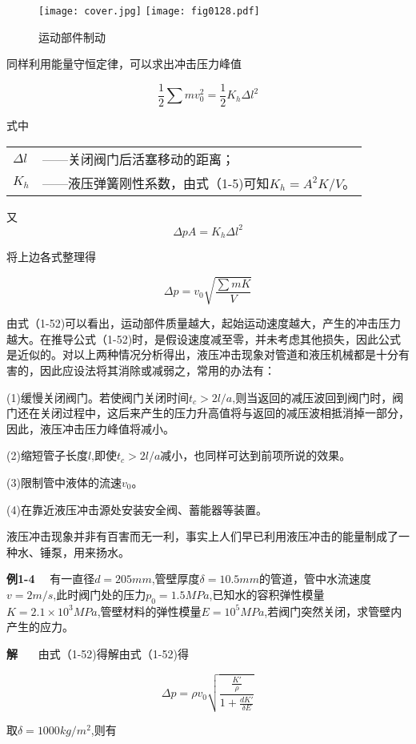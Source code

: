 \begin{figure}
\centering
\ifOpenSource
\texttt{[image: cover.jpg]}   %
\else 
\texttt{[image: fig0128.pdf]}  %
\fi
\caption{运动部件制动}
\label{fig:0434}
\end{figure}

同样利用能量守恒定律，可以求出冲击压力峰值

$$
\frac{1}{2}\sum{mv_{0}^{2}=\frac{1}{2}K_h\varDelta l^2}
$$

\noindent 式中
\begin{tabular}[t]{ll}
       $\varDelta l$ & ——关闭阀门后活塞移动的距离；\\
       $K_h$ & ——液压弹簧刚性系数，由式（1-5)可知$K_h=A^2K/V$。

\end{tabular}   

\noindent  又
$$
\varDelta pA=K_h\varDelta l^2
$$

将上边各式整理得

$$
\varDelta p=v_0\sqrt{\frac{\sum{mK}}{V}}
$$

由式（1-52)可以看出，运动部件质量越大，起始运动速度越大，产生的冲击压力越大。在推导公式（1-52)时，是假设速度减至零，并未考虑其他损失，因此公式是近似的。对以上两种情况分析得出，液压冲击现象对管道和液压机械都是十分有害的，因此应设法将其消除或减弱之，常用的办法有：

(1)缓慢关闭阀门。若使阀门关闭时间$t_c>2l/a$,则当返回的减压波回到阀门时，阀门还在关闭过程中，这后来产生的压力升高值将与返回的减压波相抵消掉一部分，因此，液压冲击压力峰值将减小。

(2)缩短管子长度$l$,即使$t_c>2l/a$减小，也同样可达到前项所说的效果。

(3)限制管中液体的流速$v_0$。

(4)在靠近液压冲击源处安装安全阀、蓄能器等装置。

液压冲击现象并非有百害而无一利，事实上人们早已利用液压冲击的能量制成了一种水、锤泵，用来扬水。

\textbf{例1-4} \ \ 
有一直径$d=205mm$,管壁厚度$\delta =10.5mm$的管道，管中水流速度$v=2m/s$,此时阀门处的压力$p_0=1.5MPa$,已知水的容积弹性模量$K=2.1×10^3MPa$,管壁材料的弹性模量$E=10^5MPa$,若阀门突然关闭，求管壁内产生的应力。

\textbf{解} \ \ \   
由式（1-52)得解由式（1-52)得

$$
\varDelta p=\rho v_0\sqrt{\frac{\frac{K'}{\rho}}{1+\frac{dK'}{\delta E}}}
$$

\noindent 取$\delta =1000kg/m^2$,则有

